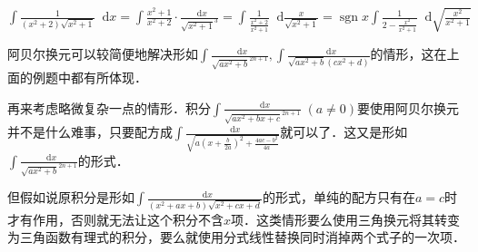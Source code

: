 \documentclass{ctexbook}
\DeclareMathOperator{\sgn}{sgn}
\newcommand*{\dif}{\mathop{}\!\mathrm{d}}
\begin{document}
$\int\frac{1}{\left(x^{2}+2\right)\sqrt{x^{2}+1}}\dif{x}=\int\frac{x^{2}+1}{x^{2}+2}\cdot\frac{\dif{x}}{\sqrt{x^{2}+1}^{3}}=\int\frac{1}{\frac{x^{2}+2}{x^{2}+1}}\dif{\frac{x}{\sqrt{x^{2}+1}}}=\sgn{x}\int\frac{1}{2-\frac{x^{2}}{x^{2}+1}}\dif{\sqrt{\frac{x^{2}}{x^{2}+1}}}$\par
阿贝尔换元可以较简便地解决形如$\int\frac{\dif{x}}{\sqrt{ax^{2}+b}^{2n+1}},\int\frac{\dif{x}}{\sqrt{ax^{2}+b}\left(cx^{2}+d\right)}$的情形，这在上面的例题中都有所体现．\par
再来考虑略微复杂一点的情形．积分$\int\frac{\dif{x}}{\sqrt{ax^{2}+bx+c}^{2n+1}}\;\left(a\ne0\right)$要使用阿贝尔换元并不是什么难事，只要配方成$\int\frac{\dif{x}}{\sqrt{a\left(x+\frac{b}{2a}\right)^{2}+\frac{4ac-b^{2}}{4a}}}$就可以了．这又是形如$\int\frac{\dif{x}}{\sqrt{ax^{2}+b}^{2n+1}}$的形式．\par
但假如说原积分是形如$\int\frac{\dif{x}}{\left(x^{2}+ax+b\right)\sqrt{x^{2}+cx+d}}$的形式，单纯的配方只有在$a=c$时才有作用，否则就无法让这个积分不含$x$项．这类情形要么使用三角换元将其转变为三角函数有理式的积分，要么就使用分式线性替换同时消掉两个式子的一次项．\par
\end{document}

